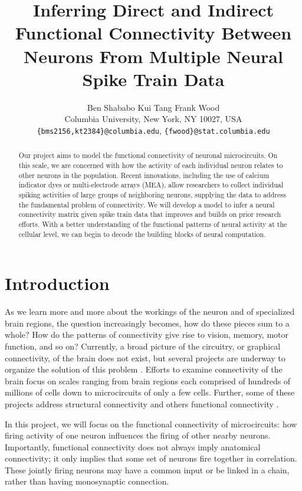 \documentclass{article}
\title{Inferring Direct and Indirect Functional Connectivity Between Neurons From Multiple Neural Spike Train Data}
\author{
Ben Shababo \hspace{1cm}Kui Tang \hspace{1cm}Frank Wood\\
Columbia University, New York, NY 10027, USA \\
\texttt{\{bms2156,kt2384\}@columbia.edu},
\texttt{\{fwood\}@stat.columbia.edu} 
}
\begin{document}
\maketitle

\begin{abstract}
Our project aims to model the functional connectivity of neuronal
microcircuits. On this scale, we are concerned with how the activity
of each individual neuron relates to other neurons in the
population. Recent innovations, including the use of calcium indicator
dyes or multi-electrode arrays (MEA), allow researchers to collect
individual spiking activities of large groups of neighboring neurons,
supplying the data to address the fundamental problem of connectivity.
We will develop a model to infer a neural connectivity matrix given
spike train data that improves and builds on prior research efforts.
With a better understanding of the functional patterns of neural
activity at the cellular level, we can begin to decode the building
blocks of neural computation.
\end{abstract}

\section{Introduction}
\label{sec:introduction}

As we learn more and more about the workings of the neuron and of
specialized brain regions, the question increasingly becomes, how
do these pieces sum to a whole? How do the patterns of connectivity
give rise to vision, memory, motor function, and so on? Currently, a broad picture of the circuitry, or graphical connectivity,
of the brain does not exist, but several projects are underway to organize the solution of
this problem \citep{Marcus2011, Bohland2009}. Efforts to examine connectivity of the brain focus on scales ranging from brain regions each comprised of hundreds of
millions of cells down to microcircuits of only a few cells. Further,
some of these projects address structural connectivity and others
functional connectivity \citep{KnowlesBarley2011, Jain2010, Ropireddy2011, Chiang2011, bhattacharya2006}.


In this project, we will focus on the functional connectivity of
microcircuits: how firing activity of one neuron influences the firing of other nearby neurons.
Importantly, functional connectivity does not always imply anatomical connectivity; it only implies that
some set of neurons fire together in correlation.  These jointly firing neurons may have a common input
or be linked in a chain, rather than having monosynaptic connection.
\end{document}
